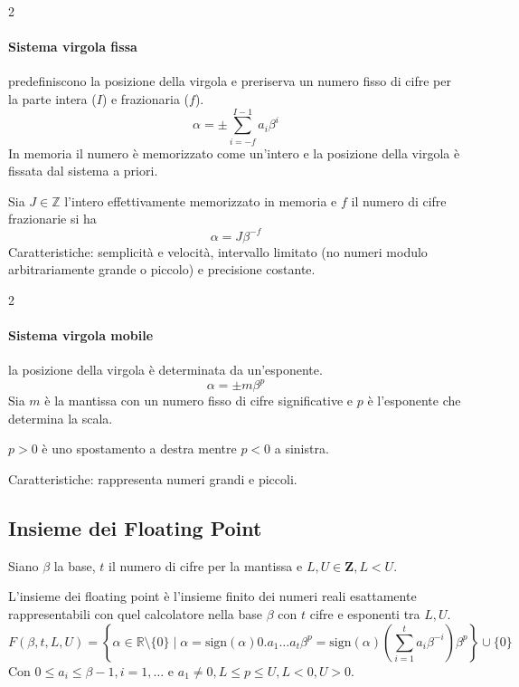 \begin{multicols}{2}
	\paragraph{Sistema virgola fissa} predefiniscono la posizione della virgola e preriserva un numero fisso di cifre per la parte intera ($I$) e frazionaria ($f$). \[\alpha=\pm\sum_{i=-f}^{I-1}a_i\beta^i\]
	In memoria il numero è memorizzato come un'intero e la posizione della virgola è fissata dal sistema a priori.

	Sia $J\in\mathbb{Z}$ l'intero effettivamente memorizzato in memoria e $f$ il numero di cifre frazionarie si ha \[\alpha=J\beta^{-f}\]
	Caratteristiche: semplicità e velocità, intervallo limitato (no numeri modulo arbitrariamente grande o piccolo) e precisione costante.
\end{multicols}
\begin{multicols}{2}
	\paragraph{Sistema virgola mobile} la posizione della virgola è determinata da un'esponente.
	\[\alpha=\pm m\beta^p\]
	Sia $m$ è la mantissa con un numero fisso di cifre significative e $p$ è l'esponente che determina la scala.

	$p>0$ è uno spostamento a destra mentre $p<0$ a sinistra.

	Caratteristiche: rappresenta numeri grandi e piccoli.
\end{multicols}
\subsection{Insieme dei Floating Point}
Siano $\beta$ la base, $t$ il numero di cifre per la mantissa e $L, U\in \textbf{Z}, L<U$.

L'insieme dei floating point è l'insieme finito dei numeri reali esattamente rappresentabili con quel calcolatore nella base $\beta$ con $t$ cifre e esponenti tra $L, U$.
{\footnotesize \[F(\beta, t, L, U)=\left\{\alpha\in\mathbb{R}\setminus\{0\}\mid\alpha=\mathrm{sign}(\alpha)0.a_1\dots a_t\beta^p=\mathrm{sign}(\alpha)\left(\sum_{i=1}^{t}a_i\beta^{-i}\right)\beta^p\right\}\cup\{0\}\]}
Con $0\leqslant a_i \leqslant \beta - 1, i=1,\dots$ e $a_1\ne0, L\leqslant p \leqslant U, L<0, U>0$.


